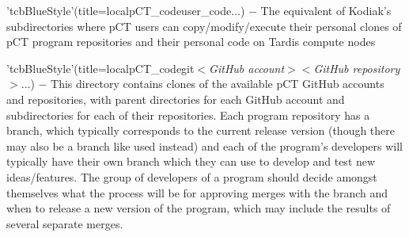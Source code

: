 \begin{tcbfunctionenv}
\begin{tcbparagraph}'tcbBlueStyle'(title=\dirsep local\dirsep pCT\_code\dirsep user\_code\dirsep\usernamelabel\dirsep$\dots$)
$\boldsymbol{-}$ The equivalent of Kodiak's  subdirectories where pCT users can copy/modify/execute their personal clones of pCT program repositories and their personal code on Tardis compute nodes
\end{tcbparagraph}
\begin{tcbparagraph}'tcbBlueStyle'(title=\dirsep local\dirsep pCT\_code\dirsep git\dirsep $<$\emph{GitHub account}$>$\dirsep $<$\emph{GitHub repository}$>$\dirsep $\dots$)
$\boldsymbol{-}$ This directory contains clones of the available pCT GitHub accounts and repositories, with parent directories for each GitHub account and subdirectories for each of their repositories.  Each program repository has a  branch, which typically corresponds to the current release version (though there may also be a branch like  used instead) and each of the program's developers will typically have their own branch which they can use to develop and test new ideas/features.  The group of developers of a program should decide amongst themselves what the process will be for approving merges with the  branch and when to release a new version of the program, which may include the results of several separate merges.\\\par


\end{tcbparagraph}
\end{tcbfunctionenv}
